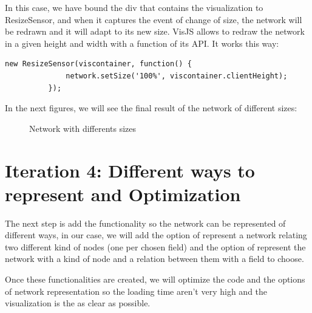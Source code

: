 \documentclass[a4paper, 12pt]{book}
\begin{document}
In this case, we have bound the div that contains the visualization to ResizeSensor, and when it captures the event of change of size, the network will be redrawn and it will adapt to its new size. VisJS allows to redraw the network in a given height and width with a function of its API. It works this way:

\begin{lstlisting}[frame=single]
          new ResizeSensor(viscontainer, function() {
              network.setSize('100%', viscontainer.clientHeight);
          });
\end{lstlisting}

In the next figures, we will see the final result of the network of different sizes:

\begin{figure}[H]
 \centering
 \caption{Network with differents sizes}
 \label{f:sigmaexamples}
\end{figure}



\section{Iteration 4: Different ways to represent and Optimization}

The next step is add the functionality so the network can be represented of different ways, in our case, we will add the option of represent a network relating two different kind of nodes (one per chosen field) and the option of represent the network with a kind of node and a relation between them with a field to choose.

Once these functionalities are created, we will optimize the code and the options of network representation so the loading time aren’t very high and the visualization is the as clear as possible.
\end{document}

